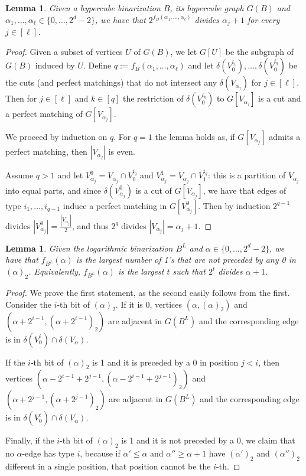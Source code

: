 \documentclass[11pt,a4paper]{article}
\newtheorem{lemma}[theorem]{Lemma}
\newcommand{\1}{\textbf{1}}
\newcommand\marco[1]{\textcolor{red}{\textbf{ MDS:  #1}}}
\begin{document}
\begin{lemma}\label{lem:matchings}
Given a hypercube binarization $B$, its hypercube graph $G(B)$  and $\alpha_1,\dots,\alpha_\ell\in\{0,\dots, 2^d-2\}$, we have that $2^{f_B(\alpha_1,\dots,\alpha_\ell)}$ divides $\alpha_j+1$ for every $j\in [\ell]$.
\end{lemma}
\begin{proof}  Given a subset of vertices $U$ of $G(B)$, we let $G[U]$ be the subgraph of $G(B)$ induced by $U$. Define $q:=f_B(\alpha_1,\dots,\alpha_\ell)$ and let $\delta(V_0^{i_1}),\dots,\delta(V_0^{i_q})$ be the cuts (and perfect matchings) that do not intersect any $\delta (V_{\alpha_j})$ for $j\in [\ell]$.   Then   for $j\in [\ell]$  and $k\in [q]$ the restriction of  $\delta(V_0^{i_k})$ to $G[V_{\alpha_j}]$ is a cut and a perfect matching of $G[V_{\alpha_j}]$.

We %
proceed by induction on $q$.   
For $q=1$ the lemma holds as, if $G[V_{\alpha_j}]$ admits a perfect matching, then $|V_{\alpha_j}|$ is even.

Assume  $q>1$ and let $V_{\alpha_j}^0=V_{\alpha_j}\cap V^{i_q}_0$ and $V_{\alpha_j}^1=V_{\alpha_j}\cap V^{i_q}_1$: this is a partition of $V_{\alpha_j}$ into equal parts, and since  $\delta(V_{\alpha_j}^0)$ is a cut of $G[V_{\alpha_j}]$, we have that edges of type $i_1,\dots, i_{q-1}$ induce a perfect matching in $G[V_{\alpha_j}^0]$. Then by induction $2^{q-1}$ divides $|V_{\alpha_j}^0|=\frac{|V_{\alpha_j}|}{2}$, and thus $2^q$ divides $|V_{\alpha_j}|=\alpha_j+1$.
\end{proof}


\begin{lemma}\label{lem:logarithmicMultiple}
Given the logarithmic binarization $B^L$  and $\alpha\in\{0,\dots, 2^d-2\}$, we have that $f_{B^L}(\alpha)$ is the largest number of 1's that are not preceded by any 0 in $(\alpha)_2$. Equivalently, $f_{B^L}(\alpha)$ is the largest $t$ such that $2^t$ divides $\alpha+1$.
\end{lemma}
\begin{proof} 
We prove the first statement, as the second easily follows from the first.
 Consider the $i$-th bit of $(\alpha)_2$. If it is 0,  vertices $(\alpha,(\alpha)_2)$ and $(\alpha+2^{i-1},(\alpha+2^{i-1})_2)$ are adjacent in $G(B^{L})$ and the  corresponding  edge is in $\delta(V^i_0)\cap \delta(V_{\alpha})$.
 
 If the $i$-th bit of $(\alpha)_2$ is 1 and it is preceded by a 0 in position  $j<i$, then vertices $(\alpha - 2^{i-1}+2^{j-1},(\alpha - 2^{i-1}+2^{j-1})_2)$ and $(\alpha +2^{j-1},(\alpha +2^{j-1})_2)$ are adjacent in $G(B^{L})$ and the   corresponding edge is  in $\delta(V^i_0)\cap \delta(V_{\alpha})$.
 
 Finally, if the $i$-th bit of $(\alpha)_2$ is 1 and it is not preceded by a 0, we claim that no $\alpha$-edge has type $i$, because if $\alpha'\le\alpha$ and  $\alpha''\ge\alpha+1$ have $(\alpha')_2$ and  $(\alpha'')_2$ different in a single position, that position cannot be the $i$-th. 
 \end{proof}
 
\end{document}
